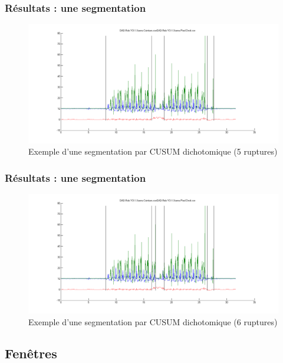 \documentclass{beamer}
\begin{document}
\begin{frame}
	\frametitle{Résultats : une segmentation}
	\begin{figure}
		\includegraphics[scale=0.3]{dikt-seg5.png}
		\caption{Exemple d'une segmentation par CUSUM dichotomique (5 ruptures)}
	\end{figure}
\end{frame}

\begin{frame}
	\frametitle{Résultats : une segmentation}
	\begin{figure}
		\includegraphics[scale=0.3]{dikt-seg6.png}
		\caption{Exemple d'une segmentation par CUSUM dichotomique (6 ruptures)}
	\end{figure}
\end{frame}


\subsection{Fenêtres}
\end{document}
